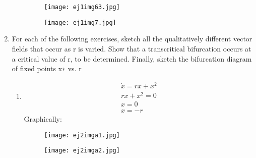 \documentclass[a4paper,10pt]{article}
\begin{document}
\begin{enumerate}
\begin{enumerate}
\begin{figure}[h]
                    \label{fig:mesh1}
                \end{figure}
                \begin{figure}[h]
                    \centering
                    \texttt{[image: ej1img63.jpg]}
                    
                    \label{fig:mesh1}
                \end{figure}
                \newpage
                \begin{figure}[h]
                    \centering
                    \texttt{[image: ej1img7.jpg]}
                    
                    \label{fig:mesh1}
                \end{figure}
                
        \end{enumerate}
    \item For each of the following exercises, sketch all the qualitatively different vector fields that occur as r is varied. Show that a transcritical bifurcation occurs at a critical value of r, to be determined. Finally,
    sketch the bifurcation diagram of fixed points x∗ vs. r
        \begin{enumerate}
            \item 
                \begin{equation}
                    \begin{aligned}
                    \dot{x}= rx + x^{2}\\
                    rx + x^{2}=0\\
                    x=0\\
                    x=-r
                    \end{aligned}
                    
                \end{equation}
                Graphically:
                \begin{figure}[h]
                    \centering
                    \texttt{[image: ej2imga1.jpg]}
                    
                    \label{fig:mesh1}
                \end{figure}
                \newpage
                \begin{figure}[h]
                    \centering
                    \texttt{[image: ej2imga2.jpg]}
                    

\end{figure}
\end{enumerate}
\end{enumerate}
\end{document}

